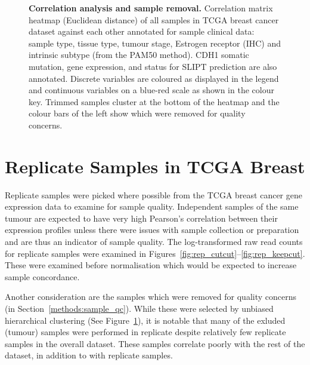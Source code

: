 \begin{figure}[!ht]
  \begin{center}
   \end{center}
   \caption[Correlation analysis and sample removal]{\small \textbf{Correlation analysis and sample removal.} Correlation matrix heatmap (Euclidean distance) of all samples in \gls{TCGA} breast cancer dataset against each other annotated for sample clinical data: sample type, tissue type, tumour stage, Estrogen receptor (IHC) and intrinsic subtype (from the \gls{PAM50} method). CDH1 somatic mutation, gene expression, and status for \gls{SLIPT} prediction are also annotated. Discrete variables are coloured as displayed in the legend and continuous variables on a blue-red scale as shown in the colour key. Trimmed samples cluster at the bottom of the heatmap and the colour bars of the left show which were removed for quality concerns.}
\label{fig:corr_map}
\end{figure}

\clearpage

\section{Replicate Samples in \gls{TCGA} Breast}
\label{appendix:replicate_samples}

Replicate samples were picked where possible from the \gls{TCGA} breast cancer gene expression data to examine for sample quality. Independent samples of the same tumour are expected to have very high Pearson's correlation between their expression profiles unless there were issues with sample collection or preparation and are thus an indicator of sample quality. The log-transformed raw read counts for replicate samples were examined in Figures~\ref{fig:rep_cutcut}\nobreakdash--\ref{fig:rep_keepcut}. These were examined before normalisation which would be expected to increase sample concordance.

Another consideration are the samples which were removed for quality concerns (in Section~\ref{methods:sample_qc}). While these were selected by unbiased hierarchical clustering (See Figure~\ref{fig:corr_map}), it is notable that many of the exluded (tumour) samples were performed in replicate despite relatively few replicate samples in the overall dataset. These samples correlate poorly with the rest of the dataset, in addition to with replicate samples.


